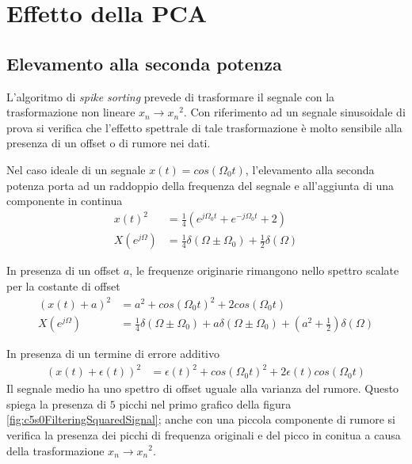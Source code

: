 \section{Effetto della PCA}
\label{sez:FiltroRumore}


\subsection{Elevamento alla seconda potenza}

L'algoritmo di {\it spike sorting} prevede di trasformare il segnale con la trasformazione non lineare $x_{n}\rightarrow x_{n}{^2}$. Con riferimento ad un segnale sinusoidale di prova si verifica che l'effetto spettrale di tale trasformazione è molto sensibile alla presenza di un offset o di rumore nei dati.

Nel caso ideale di un segnale $x(t)=cos(\Omega_{0}t)$, l'elevamento alla seconda potenza porta ad un raddoppio della frequenza del segnale e all'aggiunta di una componente in continua
\begin{align}
 x(t)^{2} &= \frac{1}{4}( e^{j\Omega_{0}t} + e^{-j\Omega_{0}t} + 2)  \\
 X(e^{j\Omega}) &= \frac{1}{4}\delta(\Omega \pm \Omega_{0}) + 
 \frac{1}{2}\delta(\Omega)
\end{align}

In presenza di un offset $a$, le frequenze originarie rimangono nello spettro scalate per la costante di offset
\begin{align}
 (x(t)+a)^{2}   &= a^{2} + cos(\Omega_{0}t)^{2} + 2cos(\Omega_{0}t)  \\
 X(e^{j\Omega}) &= \frac{1}{4}\delta(\Omega \pm \Omega_{0}) + 
 a\delta(\Omega\pm\Omega_{0}) + (a^{2} + \frac{1}{2})\delta(\Omega)
\end{align}

In presenza di un termine di errore additivo
\begin{align}
 (x(t)+\epsilon(t))^{2} &= \epsilon(t)^{2} + cos(\Omega_{0}t)^{2} + 2\epsilon(t)cos(\Omega_{0}t)
 \end{align}
Il segnale medio ha uno spettro di offset uguale alla varianza del rumore.
Questo spiega la presenza di $5$ picchi nel primo grafico della figura \ref{fig:c5s0FilteringSquaredSignal}; anche con una piccola componente di rumore si verifica la presenza dei picchi di frequenza originali e del picco in conitua a causa della trasformazione $x_{n}\rightarrow x_{n}{^2}$.

